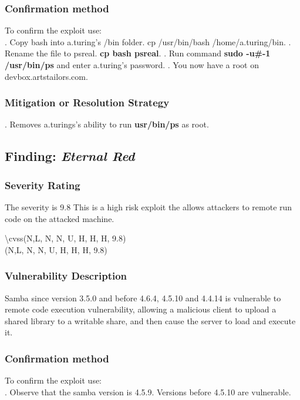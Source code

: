 \documentclass[notitlepage]{article}
\begin{document}
	\subsubsection{Confirmation method}
	To confirm the exploit use: \\
	. Copy bash into a.turing's /bin folder. cp /usr/bin/bash /home/a.turing/bin.
	. Rename the file to psreal. \textbf{cp bash psreal}.
	. Run command \textbf{sudo -u\#-1 /usr/bin/ps} and enter a.turing's password.  
	. You now have a root on devbox.artstailors.com.
	
	\subsubsection{Mitigation or Resolution Strategy}
	\indent {}. Removes a.turings's ability to run \textbf{usr/bin/ps} as root. 
	
	\subsection{Finding: \emph{Eternal Red}}
	
	\subsubsection{Severity Rating}
	\indent The severity is 9.8 This is a high risk exploit the allows attackers to remote run code on the attacked machine. 
	
	\textbackslash cvss(N,L, N, N, U, H, H, H, 9.8)\\
	\cvss(N,L, N, N, U, H, H, H, 9.8) \\
	
	\subsubsection{Vulnerability Description}
	\indent Samba since version 3.5.0 and before 4.6.4, 4.5.10 and 4.4.14 is vulnerable to remote code execution vulnerability, allowing a malicious client to upload a shared library to a writable share, and then cause the server to load and execute it.
	
	\subsubsection{Confirmation method}
	To confirm the exploit use: \\
	. Observe that the samba version is 4.5.9. Versions before 4.5.10 are vulnerable. 
	
\end{document}
